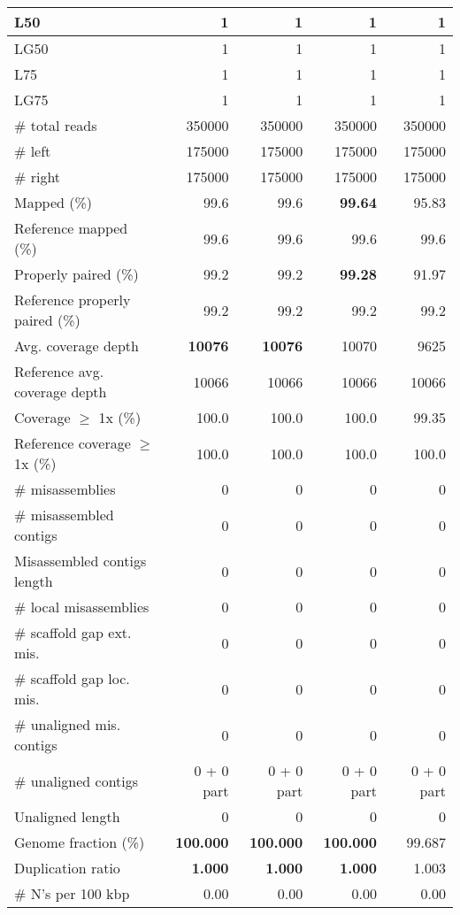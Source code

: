 \documentclass[12pt,a4paper]{article}
\begin{document}
\begin{table}[ht]
\begin{center}
\begin{tabular}{|l*{4}{|r}|}
L50 & 1 & 1 & 1 & 1 \\ \hline
LG50 & 1 & 1 & 1 & 1 \\ \hline
L75 & 1 & 1 & 1 & 1 \\ \hline
LG75 & 1 & 1 & 1 & 1 \\ \hline
\# total reads & 350000 & 350000 & 350000 & 350000 \\ \hline
\# left & 175000 & 175000 & 175000 & 175000 \\ \hline
\# right & 175000 & 175000 & 175000 & 175000 \\ \hline
Mapped (\%) & 99.6 & 99.6 & {\bf 99.64} & 95.83 \\ \hline
Reference mapped (\%) & 99.6 & 99.6 & 99.6 & 99.6 \\ \hline
Properly paired (\%) & 99.2 & 99.2 & {\bf 99.28} & 91.97 \\ \hline
Reference properly paired (\%) & 99.2 & 99.2 & 99.2 & 99.2 \\ \hline
Avg. coverage depth & {\bf 10076} & {\bf 10076} & 10070 & 9625 \\ \hline
Reference avg. coverage depth & 10066 & 10066 & 10066 & 10066 \\ \hline
Coverage $\geq$ 1x (\%) & 100.0 & 100.0 & 100.0 & 99.35 \\ \hline
Reference coverage $\geq$ 1x (\%) & 100.0 & 100.0 & 100.0 & 100.0 \\ \hline
\# misassemblies & 0 & 0 & 0 & 0 \\ \hline
\# misassembled contigs & 0 & 0 & 0 & 0 \\ \hline
Misassembled contigs length & 0 & 0 & 0 & 0 \\ \hline
\# local misassemblies & 0 & 0 & 0 & 0 \\ \hline
\# scaffold gap ext. mis. & 0 & 0 & 0 & 0 \\ \hline
\# scaffold gap loc. mis. & 0 & 0 & 0 & 0 \\ \hline
\# unaligned mis. contigs & 0 & 0 & 0 & 0 \\ \hline
\# unaligned contigs & 0 + 0 part & 0 + 0 part & 0 + 0 part & 0 + 0 part \\ \hline
Unaligned length & 0 & 0 & 0 & 0 \\ \hline
Genome fraction (\%) & {\bf 100.000} & {\bf 100.000} & {\bf 100.000} & 99.687 \\ \hline
Duplication ratio & {\bf 1.000} & {\bf 1.000} & {\bf 1.000} & 1.003 \\ \hline
\# N's per 100 kbp & 0.00 & 0.00 & 0.00 & 0.00 \\ \hline

\end{tabular}
\end{center}
\end{table}
\end{document}
